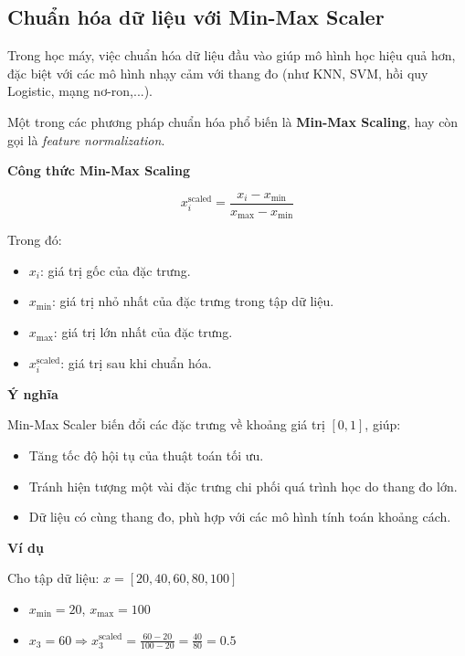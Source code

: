 \subsection {Chuẩn hóa dữ liệu với Min-Max Scaler}
\label{scaler:minmax}

Trong học máy, việc chuẩn hóa dữ liệu đầu vào giúp mô hình học hiệu quả hơn, đặc biệt với các mô hình nhạy cảm với thang đo (như KNN, SVM, hồi quy Logistic, mạng nơ-ron,...).

Một trong các phương pháp chuẩn hóa phổ biến là \textbf{Min-Max Scaling}, hay còn gọi là \textit{feature normalization}.

\textbf{Công thức Min-Max Scaling}

\[
x_i^{\text{scaled}} = \frac{x_i - x_{\min}}{x_{\max} - x_{\min}}
\]

Trong đó:
\begin{itemize}
    \item \( x_i \): giá trị gốc của đặc trưng.
    \item \( x_{\min} \): giá trị nhỏ nhất của đặc trưng trong tập dữ liệu.
    \item \( x_{\max} \): giá trị lớn nhất của đặc trưng.
    \item \( x_i^{\text{scaled}} \): giá trị sau khi chuẩn hóa.
\end{itemize}

\textbf{Ý nghĩa}

Min-Max Scaler biến đổi các đặc trưng về khoảng giá trị \([0, 1]\), giúp:

\begin{itemize}
    \item Tăng tốc độ hội tụ của thuật toán tối ưu.
    \item Tránh hiện tượng một vài đặc trưng chi phối quá trình học do thang đo lớn.
    \item Dữ liệu có cùng thang đo, phù hợp với các mô hình tính toán khoảng cách.
\end{itemize}

\textbf{Ví dụ}

Cho tập dữ liệu: \( x = [20, 40, 60, 80, 100] \)

\begin{itemize}
    \item \( x_{\min} = 20 \), \( x_{\max} = 100 \)
    \item \( x_3 = 60 \Rightarrow x_3^{\text{scaled}} = \frac{60 - 20}{100 - 20} = \frac{40}{80} = 0.5 \)
\end{itemize}

